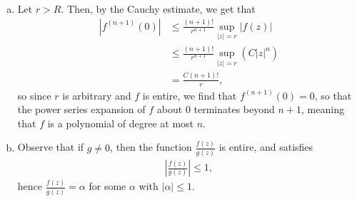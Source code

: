 \documentclass[10pt]{mypackage}
\begin{document}
\begin{solution}\hfill
  \begin{enumerate}[(a)]
    \item Let $r > R$. Then, by the Cauchy estimate, we get that
      \begin{align*}
        \left\vert f^{\left(n+1\right)}(0) \right\vert &\leq \frac{\left( n+1 \right)!}{r^{n+1}}\sup_{|z| = r} \left\vert f(z) \right\vert\\
                                                       &\leq \frac{\left( n+1 \right)!}{r^{n+1}} \sup_{|z| = r} \left( C \left\vert z \right\vert^{n} \right)\\
                                                       &= \frac{C\left( n+1 \right)!}{r},
      \end{align*}
      so since $r$ is arbitrary and $f$ is entire, we find that $ f^{(n+1)}(0) = 0 $, so that the power series expansion of $f$ about $0$ terminates beyond $n + 1$, meaning that $f$ is a polynomial of degree at most $n$.
    \item Observe that if $g\neq 0$, then the function $ \frac{f(z)}{g(z)} $ is entire, and satisfies
      \begin{align*}
        \left\vert \frac{f(z)}{g(z)} \right\vert \leq 1,
      \end{align*}
      hence $ \frac{f(z)}{g(z)} = \alpha $ for some $\alpha$ with $\left\vert \alpha \right\vert \leq 1$.
  \end{enumerate}
\end{solution}
\end{document}
